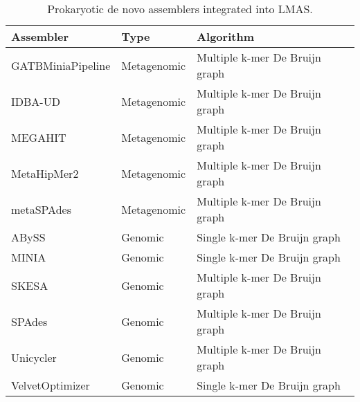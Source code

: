 \begin{scriptsize}
\begin{center}

\begin{table}[]
\centering
\caption{Prokaryotic de novo assemblers integrated into LMAS.}
\label{tab:ch5_table1}
\begin{tabular}{@{}lll@{}}
\toprule
Assembler         & Type        & Algorithm                        \\ \midrule
GATBMiniaPipeline & Metagenomic & Multiple   k-mer De Bruijn graph \\
IDBA-UD           & Metagenomic & Multiple   k-mer De Bruijn graph \\
MEGAHIT           & Metagenomic & Multiple   k-mer De Bruijn graph \\
MetaHipMer2       & Metagenomic & Multiple   k-mer De Bruijn graph \\
metaSPAdes        & Metagenomic & Multiple   k-mer De Bruijn graph \\
ABySS             & Genomic     & Single   k-mer De Bruijn graph   \\
MINIA             & Genomic     & Single   k-mer De Bruijn graph   \\
SKESA             & Genomic     & Multiple   k-mer De Bruijn graph \\
SPAdes            & Genomic     & Multiple   k-mer De Bruijn graph \\
Unicycler         & Genomic     & Multiple   k-mer De Bruijn graph \\
VelvetOptimizer   & Genomic     & Single   k-mer De Bruijn graph \\ \bottomrule
\end{tabular}
\end{table}

\end{center}
\end{scriptsize}
